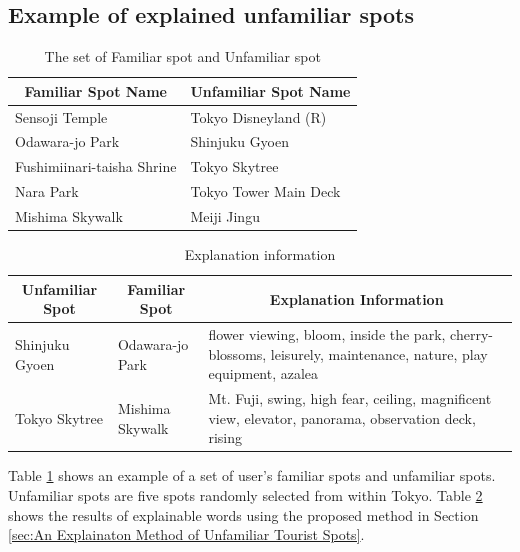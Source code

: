 \documentclass[journal]{IAENGtran}
\begin{document}
\subsection{Example of explained unfamiliar spots}
\label{subsec:Example of explained unfamiliar spots}

\begin{table}[t]
  \caption{The set of Familiar spot and Unfamiliar spot}
  \label{table:Familiar spot group and Unfamiliar spot group}
  \centering
  \begin{tabular}{l|l}
  \hline
  \multicolumn{1}{c|}{Familiar Spot Name} & \multicolumn{1}{c}{Unfamiliar Spot Name} \\ \hline
  Sensoji Temple                          & Tokyo Disneyland (R)                     \\
  Odawara-jo Park                         & Shinjuku Gyoen                           \\
  Fushimiinari-taisha Shrine              & Tokyo Skytree                            \\
  Nara Park                               & Tokyo Tower Main Deck            \\
  Mishima Skywalk                         & Meiji Jingu                              \\ \hline
  \end{tabular}
\end{table}

\begin{table}[t]
  \caption{Explanation information}
  \label{table:Explanation information}
  \centering
  \begin{tabular}{l|l|l}
  \hline
  \multicolumn{1}{c|}{Unfamiliar Spot} & \multicolumn{1}{c|}{Familiar Spot} & \multicolumn{1}{c}{Explanation Information}                     \\ \hline
  Shinjuku Gyoen                      & Odawara-jo Park                         & flower viewing, bloom, inside the park, cherry-blossoms, leisurely, maintenance, nature, play equipment, azalea          \\
  Tokyo Skytree                     & Mishima Skywalk                    & Mt. Fuji, swing, high fear, ceiling, magnificent view, elevator, panorama, observation deck, rising
 \\ \hline
  \end{tabular}
\end{table}

Table \ref{table:Familiar spot group and Unfamiliar spot group} shows an example of a set of user's familiar spots and unfamiliar spots.
Unfamiliar spots are five spots randomly selected from within Tokyo.
Table \ref{table:Explanation information} shows the results of explainable words using the proposed method in Section \ref{sec:An Explainaton Method of Unfamiliar Tourist Spots}.
\end{document}
